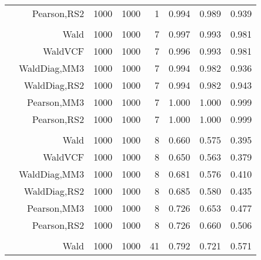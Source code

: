 \documentclass[
]{article}
\begin{document}
\begin{table}[H]
{\begin{tabular}[t]{lrrrrrrr}
\hspace{1em} & Pearson,RS2 & 1000 & 1000 & 1 & 0.994 & 0.989 & 0.939\\
\cmidrule{1-8}
\addlinespace[0.3em]
\multicolumn{8}{l}{\textbf{1F 15V}}\\
\hspace{1em} & Wald & 1000 & 1000 & 7 & 0.997 & 0.993 & 0.981\\

\hspace{1em} & WaldVCF & 1000 & 1000 & 7 & 0.996 & 0.993 & 0.981\\

\hspace{1em} & WaldDiag,MM3 & 1000 & 1000 & 7 & 0.994 & 0.982 & 0.936\\

\hspace{1em} & WaldDiag,RS2 & 1000 & 1000 & 7 & 0.994 & 0.982 & 0.943\\

\hspace{1em} & Pearson,MM3 & 1000 & 1000 & 7 & 1.000 & 1.000 & 0.999\\

\hspace{1em} & Pearson,RS2 & 1000 & 1000 & 7 & 1.000 & 1.000 & 0.999\\
\cmidrule{1-8}
\addlinespace[0.3em]
\multicolumn{8}{l}{\textbf{2F 10V}}\\
\hspace{1em} & Wald & 1000 & 1000 & 8 & 0.660 & 0.575 & 0.395\\

\hspace{1em} & WaldVCF & 1000 & 1000 & 8 & 0.650 & 0.563 & 0.379\\

\hspace{1em} & WaldDiag,MM3 & 1000 & 1000 & 8 & 0.681 & 0.576 & 0.410\\

\hspace{1em} & WaldDiag,RS2 & 1000 & 1000 & 8 & 0.685 & 0.580 & 0.435\\

\hspace{1em} & Pearson,MM3 & 1000 & 1000 & 8 & 0.726 & 0.653 & 0.477\\

\hspace{1em} & Pearson,RS2 & 1000 & 1000 & 8 & 0.726 & 0.660 & 0.506\\
\cmidrule{1-8}
\addlinespace[0.3em]
\multicolumn{8}{l}{\textbf{3F 15V}}\\
\hspace{1em} & Wald & 1000 & 1000 & 41 & 0.792 & 0.721 & 0.571\\


\end{tabular}}
\end{table}
\end{document}

